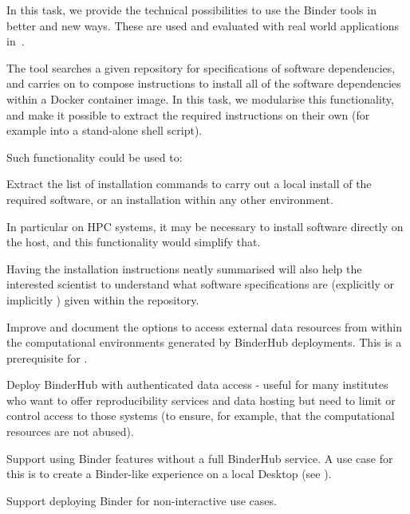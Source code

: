 \begin{task}[
  title=Support more use patterns,
  id=patterns,
  lead=SRL,
  PM=16,
  partners={MP,IFR}
]
In this task, we provide the technical possibilities to use the Binder tools in
better and new ways. These are used and evaluated with real world applications
in~.

\begin{compactitem}
\item The \repotodocker{} tool searches a given repository for specifications of
  software dependencies, and carries on to compose instructions to install all
  of the software dependencies within a Docker container image. In this task, we
  modularise this functionality, and make it possible to extract the required
  instructions on their own (for example into a stand-alone shell script).

  Such functionality could be used to:
  \begin{compactitem}
  \item Extract the list of installation commands to carry out a local install
    of the required software, or an installation within any other environment.
  \item In particular on HPC systems, it may be necessary to install software
    directly on the host, and this functionality would simplify that.
  \item Having the installation instructions neatly summarised will also help
    the interested scientist to understand what software specifications are
    (explicitly or implicitly ) given within the repository.
  \end{compactitem}

\item Improve and document the options to access external data resources from
  within the computational environments generated by BinderHub deployments. This
  is a prerequisite for .
\item Deploy BinderHub with authenticated data access - useful for many
  institutes who want to offer reproducibility services and data hosting but
  need to limit or control access to those systems (to ensure, for example, that
  the computational resources are not abused).
\item Support using Binder features without a full BinderHub service. A use case for this
  is to create a Binder-like experience on a local Desktop (see
  ).
\item Support deploying Binder for non-interactive use cases.


\end{compactitem}
\end{task}
